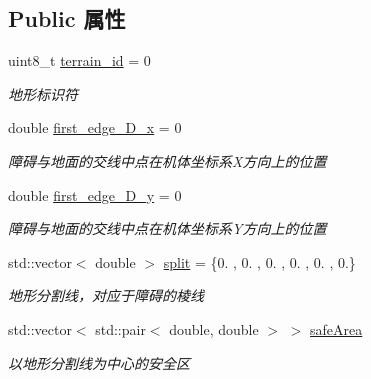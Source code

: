 \subsection*{Public 属性}
\begin{DoxyCompactItemize}
\item 
\mbox{\label{classquadruped_1_1Terrain_a10c9a4f5aafbf2dcc398217313102224}} 
uint8\+\_\+t \hyperlink{classquadruped_1_1Terrain_a10c9a4f5aafbf2dcc398217313102224}{terrain\+\_\+id} = 0
\begin{DoxyCompactList}\small\item\em 地形标识符 \end{DoxyCompactList}\item 
\mbox{\label{classquadruped_1_1Terrain_a920a6fe3be9b95ac56e354bb4e5652bc}} 
double \hyperlink{classquadruped_1_1Terrain_a920a6fe3be9b95ac56e354bb4e5652bc}{first\+\_\+edge\+\_\+\+D\+\_\+x} = 0
\begin{DoxyCompactList}\small\item\em 障碍与地面的交线中点在机体坐标系\+X方向上的位置 \end{DoxyCompactList}\item 
\mbox{\label{classquadruped_1_1Terrain_a17d5fd7b42086c04804a8cede92b4016}} 
double \hyperlink{classquadruped_1_1Terrain_a17d5fd7b42086c04804a8cede92b4016}{first\+\_\+edge\+\_\+\+D\+\_\+y} = 0
\begin{DoxyCompactList}\small\item\em 障碍与地面的交线中点在机体坐标系\+Y方向上的位置 \end{DoxyCompactList}\item 
\mbox{\label{classquadruped_1_1Terrain_a76b27de76e92a1c6672a0250e13e4a8b}} 
std\+::vector$<$ double $>$ \hyperlink{classquadruped_1_1Terrain_a76b27de76e92a1c6672a0250e13e4a8b}{split} = \{0. , 0. , 0. , 0. , 0. , 0.\}
\begin{DoxyCompactList}\small\item\em 地形分割线，对应于障碍的棱线 \end{DoxyCompactList}\item 
std\+::vector$<$ std\+::pair$<$ double, double $>$ $>$ \hyperlink{classquadruped_1_1Terrain_a69b84f242ebea84c8ef3fba2fb6a447b}{safe\+Area}
\begin{DoxyCompactList}\small\item\em 以地形分割线为中心的安全区 \end{DoxyCompactList}\item 

\end{DoxyCompactItemize}
